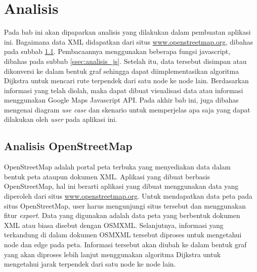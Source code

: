 \chapter{Analisis}
Pada bab ini akan dipaparkan analisis yang dilakukan dalam pembuatan aplikasi
ini. Bagaimana data XML didapatkan dari situs
\url{www.openstreetmap.org}, dibahas pada subbab \ref{ssec:analisis_osm}.
Pembacaannya menggunakan beberapa fungsi javascript, dibahas pada
subbab \ref{ssec:analisis_js}. Setelah itu, data tersebut disimpan atau dikonversi 
ke dalam bentuk graf sehingga dapat diimplementasikan algoritma
Dijkstra untuk mencari rute terpendek dari satu node ke node lain. Berdasarkan 
informasi yang telah diolah, maka dapat dibuat visualisasi data atau informasi
menggunakan Google Maps Javascript API. Pada akhir bab ini, juga dibahas
mengenai diagram \textit{use case} dan skenario untuk memperjelas apa saja 
yang dapat dilakukan oleh \textit{user} pada aplikasi ini.

\section{Analisis OpenStreetMap} \label{ssec:analisis_osm}
OpenStreetMap adalah portal peta terbuka yang menyediakan data dalam bentuk peta
ataupun dokumen XML. Aplikasi yang dibuat berbasis OpenStreetMap, hal ini
berarti aplikasi yang dibuat menggunakan data yang diperoleh dari situs
\url{www.openstreetmap.org}. Untuk mendapatkan data peta pada situs
OpenStreetMap, user harus mengunjungi situs tersebut dan menggunakan fitur
\textit{export}. Data yang digunakan adalah data peta yang berbentuk
dokumen XML atau biasa disebut dengan OSMXML. Selanjutnya, informasi yang
terkandung di dalam dokumen OSMXML tersebut diproses untuk mengetahui node dan
edge pada peta. Informasi tersebut akan diubah ke dalam bentuk graf yang akan
diproses lebih lanjut menggunakan algoritma Dijkstra untuk mengetahui jarak
terpendek dari satu node ke node lain.

